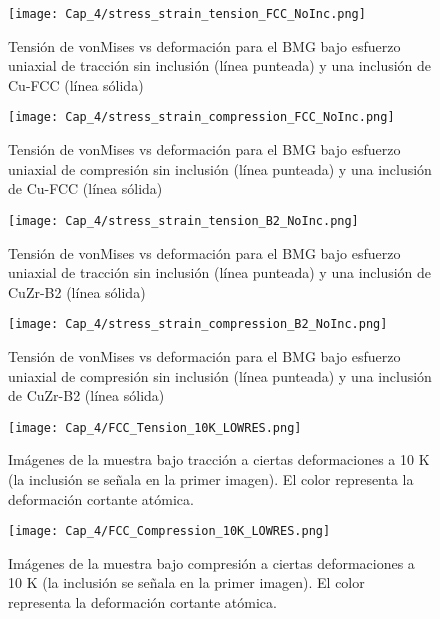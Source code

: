 \begin{figure}[htp]
\centering
\texttt{[image: Cap\_4/stress\_strain\_tension\_FCC\_NoInc.png]}
\caption[vonMises vs deformación en tracción. Inclusión Cu-FCC]{Tensión de vonMises vs deformación para el BMG bajo esfuerzo uniaxial de tracción sin inclusión (línea punteada) y una inclusión de Cu-FCC (línea sólida)}
\label{C4:fg:fcc_vm_tension}
\end{figure}

\begin{figure}[htp]
\centering
\texttt{[image: Cap\_4/stress\_strain\_compression\_FCC\_NoInc.png]}
\caption[vonMises vs deformación en compresión. Inclusión de Cu-FCC]{Tensión de vonMises vs deformación para el BMG bajo esfuerzo uniaxial de compresión sin inclusión (línea punteada) y una inclusión de Cu-FCC (línea sólida)}
\label{C4:fg:fcc_vm_compression}
\end{figure}

\begin{figure}[htp]
\centering
\texttt{[image: Cap\_4/stress\_strain\_tension\_B2\_NoInc.png]}
\caption[vonMises vs deformación en tracción. Inclusión de CuZr-B2]{Tensión de vonMises vs deformación para el BMG bajo esfuerzo uniaxial de tracción sin inclusión (línea punteada) y una inclusión de CuZr-B2 (línea sólida)}
\label{C4:fg:fcc_vm_tension}
\end{figure}

\begin{figure}[htp]
\centering
\texttt{[image: Cap\_4/stress\_strain\_compression\_B2\_NoInc.png]}
\caption[vonMises vs deformación en compresión. Inclusión de CuZr-B2]{Tensión de vonMises vs deformación para el BMG bajo esfuerzo uniaxial de compresión sin inclusión (línea punteada) y una inclusión de CuZr-B2 (línea sólida)}
\label{C4:fg:fcc_vm_compression}
\end{figure}

\begin{figure}[htp]
\centering
\texttt{[image: Cap\_4/FCC\_Tension\_10K\_LOWRES.png]}
\caption[Muestra bajo tracción a 10K]{Imágenes de la muestra bajo tracción a ciertas deformaciones a 10 K (la inclusión se señala en la primer imagen). El color representa la deformación cortante atómica.}
\label{C4:fg:fcc_tension_bmg_10K}
\end{figure}

\begin{figure}[htp]
\centering
\texttt{[image: Cap\_4/FCC\_Compression\_10K\_LOWRES.png]}
\caption[Muestra bajo compresión a 10K]{Imágenes de la muestra bajo compresión a ciertas deformaciones a 10 K (la inclusión se señala en la primer imagen). El color representa la deformación cortante atómica.}
\label{C4:fg:fcc_compression_bmg_10K}
\end{figure}

